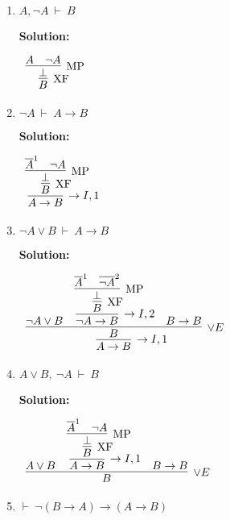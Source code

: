 \documentclass[11pt]{report}
\newcommand{\temp}[2]{{\overline{#2}}^{#1}}
\begin{document}
\begin{enumerate}
	\begin{enumerate}
		\item $ A, \neg A \ \vdash \ B$
		
		\textbf{Solution:}

		\begin{center}
			$\begin{array}{c}
				\infer[\XF]{B}
					{\infer[\MP]{\bot}
						{A & \lnot A}}
			\end{array}$
		\end{center}

		\item $\lnot A \ \vdash \ A \to B$ 
		
		\textbf{Solution:}

		\begin{center}
			$\begin{array}{c}
				\infer[\to I, 1]{A \to B}
					{\infer[\XF]{B}
						{\infer[\MP]{\bot}
							{\temp{1}{A} & \lnot A}}}
			\end{array}$
		\end{center}
		\item $\neg A \lor B \ \vdash \ A \to B$ 
		
		\textbf{Solution:}

		\begin{center}
			$\begin{array}{c}
				\infer[\to I, 1]{A \to B}
					{\infer[\lor E]{B}
						{\lnot A \lor B
						&
						\infer[\to I, 2]{\lnot A \to B}
							{\infer[\XF]{B}
								{\infer[\MP]{\bot}
									{\temp{1}{A}
									&
									\temp{2}{\lnot A}}}}
						&
						B \to B}}
			\end{array}$
		\end{center}

		\item $ A \lor B, \ \neg A \ \vdash \ B$ 
		
		\textbf{Solution:}

		\begin{center}
			$\begin{array}{c}
				\infer[\lor E]{B}
					{A \lor B
					&
					\infer[\to I, 1]{A \to B}
						{\infer[\XF]{B}
							{\infer[\MP]{\bot}
								{\temp{1}{A} & \lnot A}}}
					&
					B \to B}
			\end{array}$
		\end{center}

		\item $ \vdash \ \lnot(B \to A) \to (A \to B)$
		

\end{enumerate}
\end{enumerate}
\end{document}

